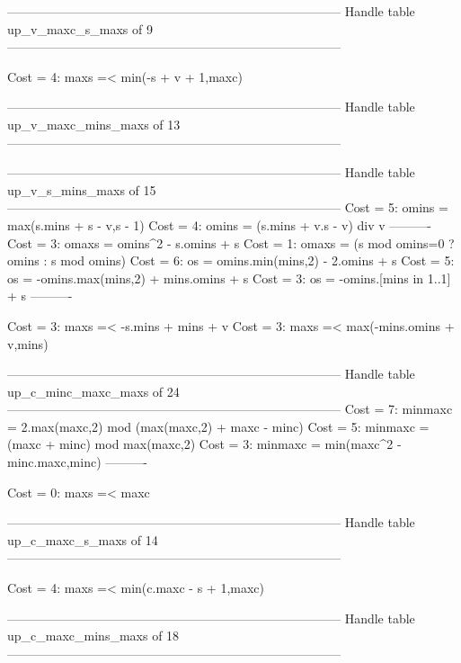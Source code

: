 --------------------------------------------------------------------------------
Handle table up_v_maxc_s_maxs of 9
--------------------------------------------------------------------------------

Cost =  4:  maxs =< min(-s + v + 1,maxc)

--------------------------------------------------------------------------------
Handle table up_v_maxc_mins_maxs of 13
--------------------------------------------------------------------------------


--------------------------------------------------------------------------------
Handle table up_v_s_mins_maxs of 15
--------------------------------------------------------------------------------
Cost =  5:  omins = max(s.mins + s - v,s - 1)
Cost =  4:  omins = (s.mins + v.s - v) div v
----------
Cost =  3:  omaxs = omins^2 - s.omins + s
Cost =  1:  omaxs = (s mod omins=0 ? omins : s mod omins)
Cost =  6:  os    = omins.min(mins,2) - 2.omins + s
Cost =  5:  os    = -omins.max(mins,2) + mins.omins + s
Cost =  3:  os    = -omins.[mins in 1..1] + s
----------

Cost =  3:  maxs =< -s.mins + mins + v
Cost =  3:  maxs =< max(-mins.omins + v,mins)

--------------------------------------------------------------------------------
Handle table up_c_minc_maxc_maxs of 24
--------------------------------------------------------------------------------
Cost =  7:  minmaxc = 2.max(maxc,2) mod (max(maxc,2) + maxc - minc)
Cost =  5:  minmaxc = (maxc + minc) mod max(maxc,2)
Cost =  3:  minmaxc = min(maxc^2 - minc.maxc,minc)
----------

Cost =  0:  maxs =< maxc

--------------------------------------------------------------------------------
Handle table up_c_maxc_s_maxs of 14
--------------------------------------------------------------------------------

Cost =  4:  maxs =< min(c.maxc - s + 1,maxc)

--------------------------------------------------------------------------------
Handle table up_c_maxc_mins_maxs of 18
--------------------------------------------------------------------------------
